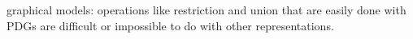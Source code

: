 \documentclass{article}
\theoremstyle{plain}
\theoremstyle{definition}
\theoremstyle{remark}
\numberwithin{equation}{section}
\begin{document}
graphical models: operations like restriction and union that are easily
done with PDGs are difficult or impossible to do with other
representations.
\end{document}
